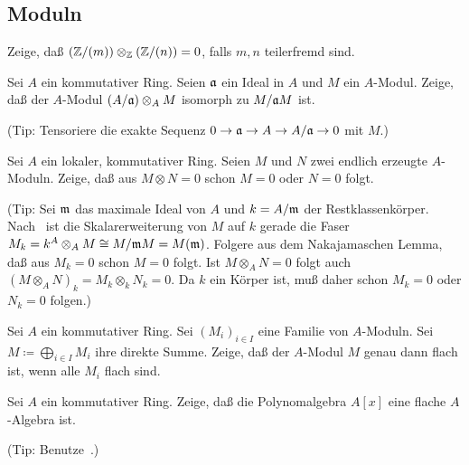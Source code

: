\subsection{Moduln}

\begin{exercise}
	Zeige, daß \((\mathbb Z/(m)) \otimes_{\mathbb Z} (\mathbb Z/(n)) = 0\), falls \(m, n\) teilerfremd
	sind.
\end{exercise}

\begin{exercise}
	\label{exer:tensor_with_quotient}
	Sei \(A\) ein kommutativer Ring. Seien \(\mathfrak{a}\) ein Ideal in \(A\) und \(M\) ein \(A\)-Modul.
	Zeige, daß der \(A\)-Modul \((A/\mathfrak{a}) \otimes_A M\) isomorph zu \(M/\mathfrak{a} M\) ist.
	
	(Tip: Tensoriere die exakte Sequenz \(0 \to \mathfrak{a} \to A \to A/\mathfrak{a} \to 0\) mit \(M\).)
\end{exercise}

\begin{exercise}
	Sei \(A\) ein lokaler, kommutativer Ring. Seien \(M\) und \(N\) zwei endlich erzeugte \(A\)-Moduln.
	Zeige, daß aus \(M \otimes N = 0\) schon \(M = 0\) oder \(N = 0\) folgt.
	
	(Tip: Sei \(\mathfrak{m}\) das maximale Ideal von \(A\) und \(k = A/\mathfrak{m}\) der Restklassenkörper.
	Nach~ ist die Skalarerweiterung von \(M\) auf \(k\) gerade die
	Faser \(M_k = k^A \otimes_A M \cong M/\mathfrak{m} M = M(\mathfrak{m})\). Folgere aus dem Nakajamaschen Lemma,
	daß aus \(M_k = 0\) schon \(M = 0\) folgt. Ist \(M \otimes_A N = 0\) folgt auch \((M \otimes_A N)_k
	= M_k \otimes_k N_k = 0\). Da \(k\) ein Körper ist, muß daher schon \(M_k = 0\) oder \(N_k = 0\) folgen.)
\end{exercise}

\begin{exercise}
	\label{exer:flatness_of_direct_sum}
	Sei \(A\) ein kommutativer Ring.
	Sei \((M_i)_{i \in I}\) eine Familie von \(A\)-Moduln. Sei \(M \coloneqq \bigoplus\limits_{i \in I}
	M_i\) ihre direkte Summe. Zeige, daß der \(A\)-Modul \(M\) genau dann flach ist, wenn alle \(M_i\) flach sind.
\end{exercise}

\begin{exercise}
	Sei \(A\) ein kommutativer Ring. Zeige, daß die Polynomalgebra \(A[x]\) eine flache \(A\)-Algebra ist.
	
	(Tip: Benutze~.)
\end{exercise}

